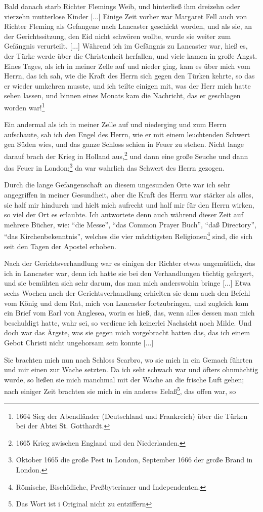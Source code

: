 Bald danach starb Richter Flemings Weib, und hinterließ
ihm dreizehn oder vierzehn mutterlose Kinder [...]
Einige Zeit vorher war Margaret Fell auch von Richter
Fleming als Gefangene nach Lancaster geschickt worden, und als
sie, an der Gerichtssitzung, den Eid nicht schwören wollte, wurde
sie weiter zum Gefängnis verurteilt. [...]
Während ich im Gefängnis zu Lancaster war, hieß es, der
Türke werde über die Christenheit herfallen, und viele kamen in
große Angst. Eines Tages, als ich in meiner Zelle auf und
nieder ging, kam es über mich vom Herrn, das ich sah, wie die
Kraft des Herrn sich gegen den Türken kehrte, so das er wieder
umkehren musste, und ich teilte einigen mit, was der Herr mich
hatte sehen lassen, und binnen eines Monats kam die Nachricht,
das er geschlagen worden war!\footnote{1664 Sieg der 
Abendländer (Deutschland und Frankreich) über die
Türken bei der Abtei St. Gotthardt.}

Ein andermal als ich in meiner Zelle auf und niederging
und zum Herrn aufschaute, sah ich den Engel des Herrn, wie er
mit einem leuchtenden Schwert gen Süden wies, und das ganze
Schloss schien in Feuer zu stehen. Nicht lange darauf brach der
Krieg in Holland aus,\footnote{1665 Krieg zwischen England 
und den Niederlanden.} und dann eine große Seuche und dann das
Feuer in London;\footnote{Oktober 1665 die große Pest in London, 
September 1666 der große Brand in London.} da war wahrlich 
das Schwert des Herrn gezogen.

Durch die lange Gefangenschaft an diesem ungesunden Orte
war ich sehr angegriffen in meiner Gesundheit, aber die Kraft
des Herrn war stärker als alles, sie half mir hindurch und hielt
mich aufrecht und half mir für den Herrn wirken, so viel der
Ort es erlaubte. Ich antwortete denn auch während dieser Zeit
auf mehrere Bücher, wie: "`die Messe"', "`das Common Prayer
Buch"', "`daß Directory"', "`das Kirchenbekenntnis"', welches die
vier mächtigsten Religionen\footnote{Römische, Bischöfliche, 
Preßbyterianer und Independenten.} sind, die sich seit den Tagen der
Apostel erhoben.

Nach der Gerichtsverhandlung war es einigen der Richter
etwas ungemütlich, das ich in Lancaster war, denn ich hatte sie
bei den Verhandlungen tüchtig geärgert, und sie bemühten sich
sehr darum, das man mich anderswohin bringe [...] Etwa sechs
Wochen nach der Gerichtsverhandlung erhielten sie denn auch den
Befehl vom König und dem Rat, mich von Lancaster fortzubringen,
und zugleich kam ein Brief vom Earl von 
Anglesea, worin es
hieß, das, wenn alles dessen man mich beschuldigt hatte, wahr
sei, so verdiene ich keinerlei Nachsicht noch Milde. Und doch war
das Ärgste, was sie gegen mich vorgebracht hatten das, das ich
einem Gebot Christi nicht ungehorsam sein konnte [...]

Sie brachten mich nun nach Schloss Scarbro, wo sie mich in
ein Gemach führten und mir einen zur Wache setzten. Da ich seht
schwach war und öfters ohnmächtig wurde, so ließen sie mich
manchmal mit der Wache an die frische Luft gehen; nach einiger
Zeit brachten sie mich in ein anderes Eelaß\footnote{Das Wort 
ist i Original nicht zu entziffern}, das offen war, so